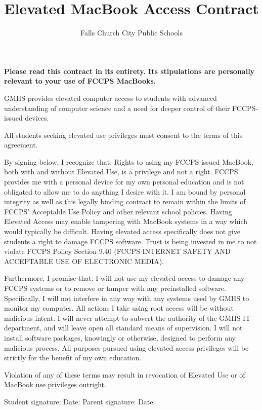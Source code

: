 \documentclass{article}
\title{Elevated MacBook Access Contract}
\author{Falls Church City Public Schools}
\begin{document}
\maketitle
\noindent\textbf{Please read this contract in its entirety. Its stipulations are personally relevant to your use of FCCPS MacBooks.}

GMHS provides elevated computer access to students with advanced understanding of computer science and a need for deeper control of their FCCPS-issued devices.

All students seeking elevated use privileges must consent to the terms of this agreement.

By signing below, I recognize that:
Rights to using my FCCPS-issued MacBook, both with and without Elevated Use, is a privilege and not a right. FCCPS provides me with a personal device for my own personal education and is not obligated to allow me to do anything I desire with it.
I am bound by personal integrity as well as this legally binding contract to remain within the limits of FCCPS’ Acceptable Use Policy and other relevant school policies.
Having Elevated Access may enable tampering with MacBook systems in a way which would typically be difficult. Having elevated access specifically does not give students a right to damage FCCPS software.
Trust is being invested in me to not violate FCCPS Policy Section 9.40 (FCCPS INTERNET SAFETY AND ACCEPTABLE USE OF ELECTRONIC MEDIA).

Furthermore, I promise that:
I will not use my elevated access to damage any FCCPS systems or to remove or tamper with any preinstalled software. Specifically, I will not interfere in any way with any systems used by GMHS to monitor my computer.
All actions I take using root access will be without malicious intent. I will never attempt to subvert the authority of the GMHS IT department, and will leave open all standard means of supervision.
I will not install software packages, knowingly or otherwise, designed to perform any malicious process.
All purposes pursued using elevated access privileges will be strictly for the benefit of my own education.

Violation of any of these terms may result in revocation of Elevated Use or of MacBook use privileges outright.

Student signature: \underline{\hspace{3cm}} Date: \underline{\hspace{2cm}}
Parent signature:  \underline{\hspace{3cm}} Date: \underline{\hspace{2cm}}
\end{document}

